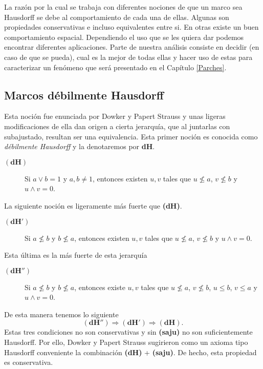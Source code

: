 La razón por la cual se trabaja con diferentes nociones de que un marco sea Hausdorff se debe al comportamiento de cada una de ellas. Algunas son propiedades conservativas e incluso equivalentes entre si. En otras existe un buen comportamiento espacial. Dependiendo el uso que se les quiera dar podemos encontrar diferentes aplicaciones. Parte de nuestra análisis consiste en decidir (en caso de que se pueda), cual es la mejor de todas ellas y hacer uso de estas para caracterizar un fenómeno que será presentado en el Capítulo \ref{Parches}.

\subsection{Marcos débilmente Hausdorff}

Esta noción fue enunciada por Dowker y Papert Strauss y unas ligeras modificaciones de ella dan origen a cierta jerarquía, que al juntarlas con subajustado, resultan ser una equivalencia. Esta primer noción es conocida como \emph{débilmente Hausdorff} y la denotaremos por \textbf{dH}.\\

\begin{description}
    \item[$\mathbf{(dH)}$] Si $a\vee b=1$ y $a, b\neq 1$, entonces existen $u, v$ tales que $u\nleq a$, $v\nleq b$ y $u\wedge v=0$. 
\end{description}

La siguiente noción es ligeramente más fuerte que \textbf{(dH)}.

\begin{description}
    \item[$\mathbf{(dH')}$] Si $a\nleq b$ y $b\nleq a$, entonces existen $u, v$ tales que $u\nleq a$, $v\nleq b$ y $u\wedge v=0$. 
\end{description}

Esta última es la más fuerte de esta jerarquía

\begin{description}
    \item[$\mathbf{(dH'')}$] Si $a\nleq b$ y $b\nleq a$, entonces existe $u, v$ tales que $u\nleq a$, $v\nleq b$, $u\leq b$, $v\leq a$ y $u\wedge v=0$.  
\end{description}

De esta manera tenemos lo siguiente
\[
\mathbf{(dH'')}\Rightarrow \mathbf{(dH')}\Rightarrow \mathbf{(dH)}.
\]
Estas tres condiciones no son conservativas y sin \textbf{(saju)} no son suficientemente Hausdorff. Por ello, Dowker y Papert Strauss sugirieron como un axioma tipo Hausdorff conveniente la combinación \textbf{(dH)} + \textbf{(saju)}. De hecho, esta propiedad es conservativa. 

